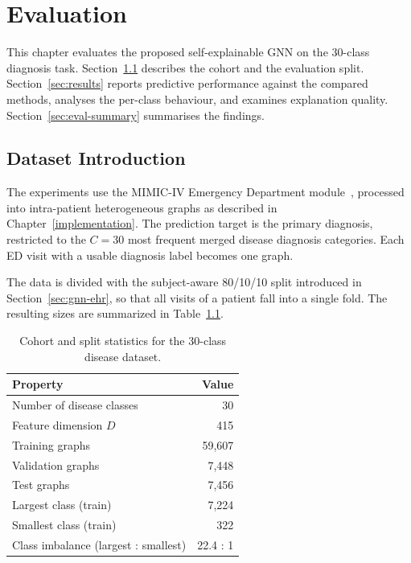 \chapter{Evaluation}\label{evaluation}

This chapter evaluates the proposed self-explainable GNN on the 30-class
diagnosis task. Section~\ref{sec:dataset} describes the cohort and the
evaluation split. Section~\ref{sec:results} reports predictive performance
against the compared methods, analyses the per-class behaviour, and examines
explanation quality. Section~\ref{sec:eval-summary} summarises the findings.

\section{Dataset Introduction}
\label{sec:dataset}

The experiments use the MIMIC-IV Emergency Department
module~\cite{johnson2023mimicived}, processed into intra-patient heterogeneous
graphs as described in Chapter~\ref{implementation}. The prediction target is
the primary diagnosis, restricted to the $C = 30$ most frequent merged disease diagnosis categories. Each ED visit with a usable diagnosis label becomes one
graph.

The data is divided with the subject-aware 80/10/10 split introduced in
Section~\ref{sec:gnn-ehr}, so that all visits of a patient fall into a single
fold. The resulting sizes are summarized in Table~\ref{tab:dataset-stats}.

\begin{table}[htbp]
  \centering
  \caption{Cohort and split statistics for the 30-class disease dataset.}
  \label{tab:dataset-stats}
  \begin{tabular}{lr}
    \toprule
    Property & Value \\
    \midrule
    Number of disease classes & 30 \\
    Feature dimension $D$ & 415 \\
    Training graphs & 59{,}607 \\
    Validation graphs & 7{,}448 \\
    Test graphs & 7{,}456 \\
    Largest class (train) & 7{,}224 \\
    Smallest class (train) & 322 \\
    Class imbalance (largest : smallest) & 22.4 : 1 \\
    \bottomrule
  \end{tabular}
\end{table}

